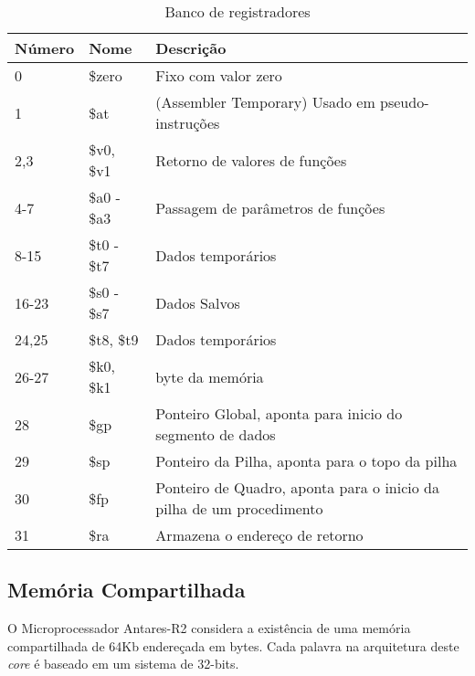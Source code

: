 \documentclass{report}
\begin{document}
\FloatBarrier
    \begin{table}[H]
      \begin{center}
        \begin{tabular}[pos]{|m{2cm} |m{3cm} | m{8cm}|} 
          \hline
          \cellcolor[gray]{0.9}\textbf{Número} & \cellcolor[gray]{0.9}\textbf{Nome} & \cellcolor[gray]{0.9}\textbf{Descrição} \\ \hline
              0  &  \$zero 			& Fixo com valor zero\\ \hline
              1  &  \$at 			& (Assembler Temporary) Usado em pseudo-instruções \\ \hline
              2,3  &  \$v0, \$v1 	&Retorno de valores de funções \\ \hline
              4-7  &  \$a0 - \$a3 	&Passagem de parâmetros de funções  \\ \hline
              8-15  &  \$t0 - \$t7 	&Dados temporários \\ \hline
              16-23  &  \$s0 - \$s7 &Dados Salvos \\ \hline
              24,25  &  \$t8, \$t9 	&Dados temporários \\ \hline
              26-27  &  \$k0, \$k1 	&byte da memória \\ \hline
              28  &  \$gp 			& Ponteiro Global, aponta para inicio do segmento de dados \\ \hline
              29  &  \$sp 			& Ponteiro da Pilha, aponta para o topo da pilha\\ \hline
              30  &  \$fp 			& Ponteiro de Quadro, aponta para o inicio da pilha de um procedimento\\ \hline
              31  &  \$ra 			& Armazena o endereço de retorno\\ \hline     
        \end{tabular}
         \caption{Banco de registradores}
		\label{table:registradores}
      \end{center}
    \end{table}

    
\subsection{Memória Compartilhada}

O Microprocessador Antares-R2 considera a existência de uma memória compartilhada de 64Kb endereçada em bytes. Cada palavra na arquitetura deste \textit{core} é baseado em um sistema de 32-bits.
\end{document}
